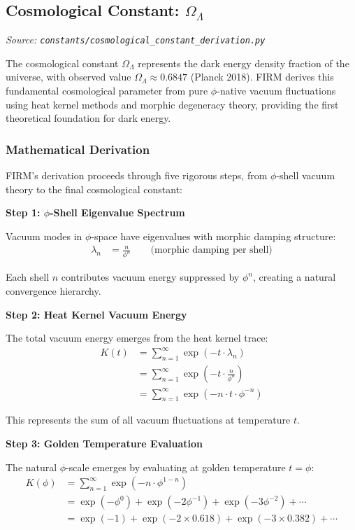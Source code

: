 
\subsection{Cosmological Constant: $\Omega_\Lambda$}
\textit{Source: \texttt{constants/cosmological\_constant\_derivation.py}}

The cosmological constant $\Omega_\Lambda$ represents the dark energy density fraction of the universe, with observed value $\Omega_\Lambda \approx 0.6847$ (Planck 2018). FIRM derives this fundamental cosmological parameter from pure $\phi$-native vacuum fluctuations using heat kernel methods and morphic degeneracy theory, providing the first theoretical foundation for dark energy.

\subsubsection{Mathematical Derivation}

FIRM's derivation proceeds through five rigorous steps, from $\phi$-shell vacuum theory to the final cosmological constant:

\textbf{Step 1: $\phi$-Shell Eigenvalue Spectrum}

Vacuum modes in $\phi$-space have eigenvalues with morphic damping structure:
\begin{align}
\lambda_n &= \frac{n}{\phi^n} \qquad \text{(morphic damping per shell)}
\end{align}

Each shell $n$ contributes vacuum energy suppressed by $\phi^n$, creating a natural convergence hierarchy.

\textbf{Step 2: Heat Kernel Vacuum Energy}

The total vacuum energy emerges from the heat kernel trace:
\begin{align}
K(t) &= \sum_{n=1}^{\infty} \exp(-t \cdot \lambda_n) \\
&= \sum_{n=1}^{\infty} \exp\left(-t \cdot \frac{n}{\phi^n}\right) \\
&= \sum_{n=1}^{\infty} \exp(-n \cdot t \cdot \phi^{-n})
\end{align}

This represents the sum of all vacuum fluctuations at temperature $t$.

\textbf{Step 3: Golden Temperature Evaluation}

The natural $\phi$-scale emerges by evaluating at golden temperature $t = \phi$:
\begin{align}
K(\phi) &= \sum_{n=1}^{\infty} \exp(-n \cdot \phi^{1-n}) \\
&= \exp(-\phi^0) + \exp(-2\phi^{-1}) + \exp(-3\phi^{-2}) + \cdots \\
&= \exp(-1) + \exp(-2 \times 0.618) + \exp(-3 \times 0.382) + \cdots
\end{align}

